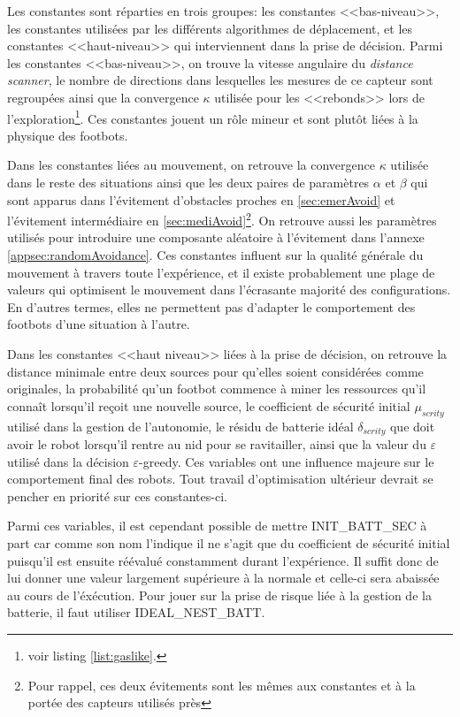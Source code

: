 Les constantes sont réparties en trois groupes: les constantes <<bas-niveau>>, les constantes utilisées par les différents algorithmes de déplacement, et les constantes <<haut-niveau>> qui interviennent dans la prise de décision. Parmi les constantes <<bas-niveau>>, on trouve la vitesse angulaire du \emph{distance scanner}, le nombre de directions dans lesquelles les mesures de ce capteur sont regroupées ainsi que la convergence $\kappa$ utilisée pour les <<rebonds>> lors de l'exploration\footnote{voir listing \ref{list:gaslike}.}. Ces constantes jouent un rôle mineur et sont plutôt liées à la physique des footbots.

Dans les constantes liées au mouvement, on retrouve la convergence $\kappa$ utilisée dans le reste des situations ainsi que les deux paires de paramètres $\alpha$ et $\beta$ qui sont apparus dans l'évitement d'obstacles proches en \ref{sec:emerAvoid} et l'évitement intermédiaire en \ref{sec:mediAvoid}\footnote{Pour rappel, ces deux évitements sont les mêmes aux constantes et à la portée des capteurs utilisés près}. On retrouve aussi les paramètres utilisés pour introduire une composante aléatoire à l'évitement dans l'annexe \ref{appsec:randomAvoidance}. Ces constantes influent sur la qualité générale du mouvement à travers toute l'expérience, et il existe probablement une plage de valeurs qui optimisent le mouvement dans l'écrasante majorité des configurations. En d'autres termes, elles ne permettent pas d'adapter le comportement des footbots d'une situation à l'autre.

Dans les constantes <<haut niveau>> liées à la prise de décision, on retrouve la distance minimale entre deux sources pour qu'elles soient considérées comme originales, la probabilité qu'un footbot commence à miner les ressources qu'il connaît lorsqu'il reçoit une nouvelle source, le coefficient de sécurité initial $\mu_{scrity}$ utilisé dans la gestion de l'autonomie, le résidu de batterie idéal $\delta_{scrity}$ que doit avoir le robot lorsqu'il rentre au nid pour se ravitailler, ainsi que la valeur du $\varepsilon$ utilisé dans la décision $\varepsilon$-greedy. Ces variables ont une influence majeure sur le comportement final des robots. Tout travail d'optimisation ultérieur devrait se pencher en priorité sur ces constantes-ci.

Parmi ces variables, il est cependant possible de mettre {\ttfamily INIT\_BATT\_SEC} à part car comme son nom l'indique il ne s'agit que du coefficient de sécurité initial puisqu'il est ensuite réévalué constamment durant l'expérience. Il suffit donc de lui donner une valeur largement supérieure à la normale et celle-ci sera abaissée au cours de l'éxécution. Pour jouer sur la prise de risque liée à la gestion de la batterie, il faut utiliser {\ttfamily IDEAL\_NEST\_BATT}.

